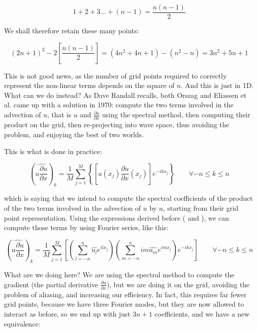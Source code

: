 \begin{equation}
	1+2+3 ... + (n-1) =   \frac{n(n-1)}{2} 
\end{equation}

We shall therefore retain these many points:

\begin{equation}
(2n+1)^2 - 2 \left[  \frac{n(n-1)}{2}  \right] =   (4n^2 + 4n +1) -  (n^2 - n)  = 3n^2 + 5n +1
\end{equation}

This is not good news, as the number of grid points required to correctly represent the non-linear terms depends on the square of $n$. And this is just in 1D. What can we do instead? As Dave Randall recalls, both Orszag and Eliassen et al. came up with a solution in 1970: compute the two terms involved in the advection of $u$, that is $u$ and $\frac{\partial u}{\partial x}$ using the spectral method, then computing their product on the grid, then re-projecting into wave space, thus avoiding the problem, and enjoying the best of two worlds. 

This is what is done in practice:

\begin{equation}
	\left( \widehat{u   \frac{\partial u}{\partial x}} \right) _k  =  \frac{1}{M}  \sum_{j=1}^{M}  \left\{  \left[ u (x_j) \frac{\partial u}{\partial x} (x_j) \right]   e^{-ikx_j}       \right\}  \qquad  \forall -n \le k \le n
	\label{spectral_on_grid1}
\end{equation}

which is saying that we intend to compute the spectral coefficients of the product of the two terms involved in the advection of $u$ by $u$, starting from their grid point representation. Using the expressions derived before (   and   ), we can compute those terms by using Fourier series, like this:

\begin{equation}
	\left( \widehat{u   \frac{\partial u}{\partial x}} \right) _k  =  \frac{1}{M}  \sum_{j=1}^{M}  
	\left[  \left( \sum_{l=-n}^{n}  \widehat{u_l} e^{ilx_j} \right)    \left(  \sum_{m=-n}^{n} 	im \widehat{u_m} e^{imx_j} \right) e^{-ikx_j}       
	\right]  \qquad  \forall -n \le k \le n
	\label{spectral_on_grid2}
\end{equation}

What are we doing here? We are using the spectral method to compute the gradient (the partial derivative $\frac{\partial u}{\partial x}$), but we are doing it on the grid, avoiding the problem of aliasing, and increasing our efficiency. In fact, this requires far fewer grid points, because we have three Fourier modes, but they are now allowed to interact as before, so we end up with just $3n+1$ coefficients, and we have a new equivalence:

